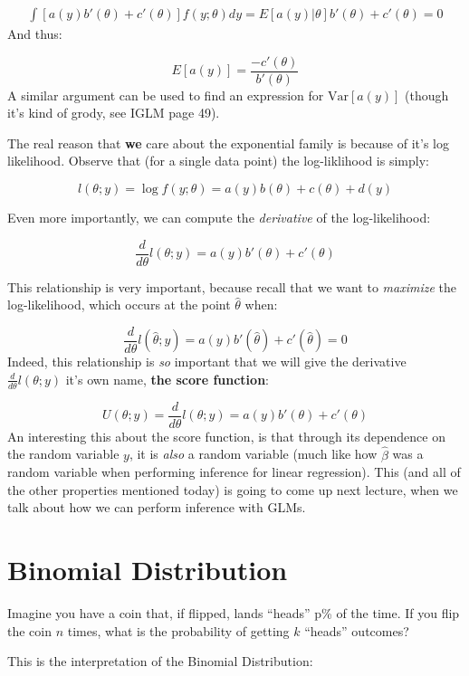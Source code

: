 \documentclass[
]{article}
\begin{document}
\[
\begin{split}
\int [a(y) b'(\theta) + c'(\theta)] f(y;\theta) dy =  E[a(y)|\theta] b'(\theta) + c'(\theta) = 0
\end{split}
\] And thus:

\[
E[a(y)] = \frac{ -c'(\theta)}{b'(\theta)}
\] A similar argument can be used to find an expression for
\(\text{Var}[a(y)]\) (though it's kind of grody, see IGLM page 49).

The real reason that \textbf{we} care about the exponential family is
because of it's log likelihood. Observe that (for a single data point)
the log-liklihood is simply:

\[
l(\theta; y) = \log{f(y;\theta)} = a(y)b(\theta) + c(\theta) + d(y)
\]

Even more importantly, we can compute the \emph{derivative} of the
log-likelihood:

\[
\frac{d}{d \theta} l(\theta; y) = a(y)b'(\theta) + c'(\theta)
\]

This relationship is very important, because recall that we want to
\emph{maximize} the log-likelihood, which occurs at the point
\(\hat{\theta}\) when:

\[
\frac{d}{d \theta} l(\hat{\theta}; y) = a(y)b'(\hat{\theta}) + c'(\hat{\theta}) = 0
\] Indeed, this relationship is \emph{so} important that we will give
the derivative \(\frac{d}{d \theta} l(\theta; y)\) it's own name,
\textbf{the score function}:

\[
U(\theta; y) = \frac{d}{d \theta} l(\theta; y) = a(y)b'(\theta) + c'(\theta)
\] An interesting this about the score function, is that through its
dependence on the random variable \(y\), it is \emph{also} a random
variable (much like how \(\hat{\beta}\) was a random variable when
performing inference for linear regression). This (and all of the other
properties mentioned today) is going to come up next lecture, when we
talk about how we can perform inference with GLMs.

\hypertarget{binomial-distribution}{%
\section{Binomial Distribution}\label{binomial-distribution}}

Imagine you have a coin that, if flipped, lands ``heads'' p\% of the
time. If you flip the coin \(n\) times, what is the probability of
getting \(k\) ``heads'' outcomes?

This is the interpretation of the Binomial Distribution:
\end{document}
